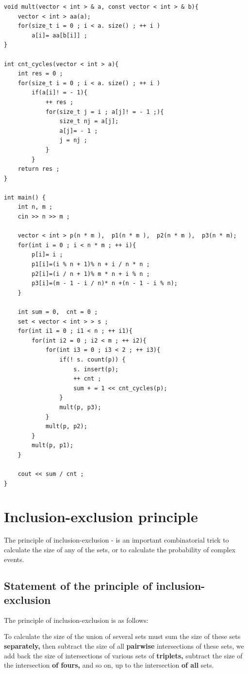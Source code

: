 \begin{verbatim}
void mult(vector < int > & a, const vector < int > & b){
    vector < int > aa(a);
    for(size_t i = 0 ; i < a. size() ; ++ i )
        a[i]= aa[b[i]] ;
}
 
int cnt_cycles(vector < int > a){
    int res = 0 ;
    for(size_t i = 0 ; i < a. size() ; ++ i )
        if(a[i]! = - 1){
            ++ res ;
            for(size_t j = i ; a[j]! = - 1 ;){
                size_t nj = a[j];
                a[j]= - 1 ;
                j = nj ;
            }
        }
    return res ;
}
 
int main() {
    int n, m ;
    cin >> n >> m ;
 
    vector < int > p(n * m ),  p1(n * m ),  p2(n * m ),  p3(n * m);
    for(int i = 0 ; i < n * m ; ++ i){
        p[i]= i ;
        p1[i]=(i % n + 1)% n + i / n * n ;
        p2[i]=(i / n + 1)% m * n + i % n ;
        p3[i]=(m - 1 - i / n)* n +(n - 1 - i % n);
    }
 
    int sum = 0,  cnt = 0 ;
    set < vector < int > > s ;
    for(int i1 = 0 ; i1 < n ; ++ i1){
        for(int i2 = 0 ; i2 < m ; ++ i2){
            for(int i3 = 0 ; i3 < 2 ; ++ i3){
                if(! s. count(p)) {
                    s. insert(p);
                    ++ cnt ;
                    sum + = 1 << cnt_cycles(p);
                }
                mult(p, p3);
            }
            mult(p, p2);
        }
        mult(p, p1);
    }
 
    cout << sum / cnt ;
} 
\end{verbatim}
\section{ Inclusion-exclusion principle }
The principle of inclusion-exclusion - is an important combinatorial trick to calculate the size of any of the sets, or to calculate the probability of complex events.

\subsection{ Statement of the principle of inclusion-exclusion }

The principle of inclusion-exclusion is as follows:

To calculate the size of the union of several sets must sum the size of these sets \textbf{separately,} then subtract the size of all \textbf{pairwise} intersections of these sets, we add back the size of intersections of various sets of \textbf{triplets,} subtract the size of the intersection \textbf{of fours,} and so on, up to the intersection \textbf{of all} sets.

